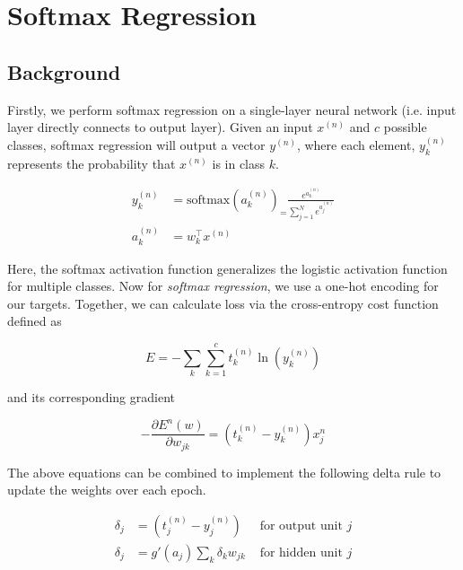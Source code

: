 \section{Softmax Regression}

\subsection{Background}
Firstly, we perform softmax regression on a single-layer neural network (i.e.
input layer directly connects to output layer). Given an input $x^{(n)}$ and $c$
possible classes, softmax regression will output a vector $y^{(n)}$, where each
element, $y^{(n)}_k$ represents the probability that $x^{(n)}$ is in class $k$.

\begin{equation*}
	\begin{aligned}
		y^{(n)}_k & = \text{softmax}(a^{(n)}_k)_ =
		\frac{e^{a^{(n)}_k}}{\sum_{j=1}^{N} e^{a^{(n)}_j}} \\
		a^{(n)}_k & = w^\top_k x^{(n)}
	\end{aligned}
\end{equation*}

Here, the softmax activation function generalizes the logistic activation
function for multiple classes. Now for \textit{softmax regression}, we use a
one-hot encoding for our targets. Together, we can calculate loss via the
cross-entropy cost function defined as

\begin{equation*}
	E = - \sum_k \sum_{k = 1}^c t^{(n)}_k \ln \left( y^{(n)}_k \right)
\end{equation*}

and its corresponding gradient

\begin{equation*}
	-\frac{\partial E^n(w)}{\partial w_{j k}}=\left(t_k^{(n)}-y_k^{(n)}\right) x_j^n
\end{equation*}

The above equations can be combined to implement the following delta rule to
update the weights over each epoch.

\begin{equation*}
	\begin{aligned}
		\delta_j & = (t_j^{(n)}-y_j^{(n)})         & \text{ for output unit } j \\
		\delta_j & = g'(a_j)\sum_k \delta_k w_{jk} & \text{ for hidden unit } j
	\end{aligned}
\end{equation*}

